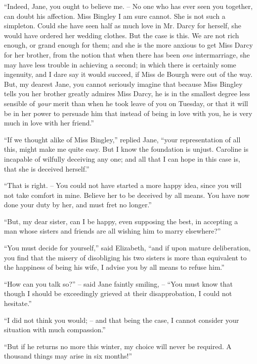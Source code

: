 “Indeed, Jane, you ought to believe me. -- No one who
has ever seen you together, can doubt his affection. Miss
Bingley I am sure cannot. She is not such a simpleton.
Could she have seen half as much love in Mr. Darcy for
herself, she would have ordered her wedding clothes. But
the case is this. We are not rich enough, or grand enough
for them; and she is the more anxious to get Miss Darcy
for her brother, from the notion that when there has been
\textit{one} intermarriage, she may have less trouble in achieving
a second; in which there is certainly some ingenuity, and
I dare say it would succeed, if Miss de Bourgh were out
of the way. But, my dearest Jane, you cannot seriously
imagine that because Miss Bingley tells you her brother
greatly admires Miss Darcy, he is in the smallest degree
less sensible of \textit{your} merit than when he took leave of you
on Tuesday, or that it will be in her power to persuade
him that instead of being in love with you, he is very
much in love with her friend.”

“If we thought alike of Miss Bingley,” replied Jane,
“your representation of all this, might make me quite
easy. But I know the foundation is unjust. Caroline is
incapable of wilfully deceiving any one; and all that
I can hope in this case is, that she is deceived herself.”

“That is right. -- You could not have started a more
happy idea, since you will not take comfort in mine.
Believe her to be deceived by all means. You have now
done your duty by her, and must fret no longer.”

“But, my dear sister, can I be happy, even supposing
the best, in accepting a man whose sisters and friends are
all wishing him to marry elsewhere?”

“You must decide for yourself,” said Elizabeth, “and
if upon mature deliberation, you find that the misery of
disobliging his two sisters is more than equivalent to the
happiness of being his wife, I advise you by all means
to refuse him.”

“How can you talk so?” -- said Jane faintly smiling, -- “You
must know that though I should be exceedingly
grieved at their disapprobation, I could not hesitate.”

“I did not think you would; -- and that being the case,
I cannot consider your situation with much compassion.”

“But if he returns no more this winter, my choice will
never be required. A thousand things may arise in six
months!”


